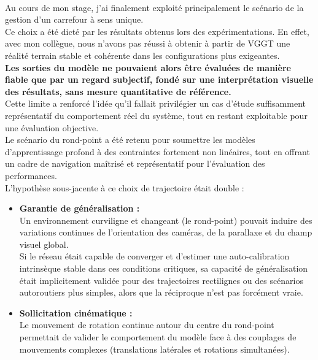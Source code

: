 \documentclass[12pt,a4paper,oneside]{report}
\begin{document}
\paragraph{}
Au cours de mon stage, j'ai finalement exploité principalement le scénario de la gestion d'un carrefour à sens unique.\\
\hspace*{.5cm}Ce choix a été dicté par les résultats obtenus lors des expérimentations. En effet, avec mon collègue, nous n'avons pas réussi à obtenir à partir de VGGT une réalité terrain stable et cohérente dans les configurations plus exigeantes.\\
\hspace*{.5cm}\textbf{Les sorties du modèle ne pouvaient alors être évaluées de manière fiable que par un regard subjectif, fondé sur une interprétation visuelle des résultats, sans mesure quantitative de référence.\\}
\hspace*{.5cm}Cette limite a renforcé l'idée qu'il fallait privilégier un cas d'étude suffisamment représentatif du comportement réel du système, tout en restant exploitable pour une évaluation objective. \\
\hspace*{.5cm}Le scénario du rond-point a été retenu pour soumettre les modèles d'apprentissage profond à des contraintes fortement non linéaires, tout en offrant un cadre de navigation maîtrisé et représentatif pour l'évaluation des performances.\\
L'hypothèse sous-jacente à ce choix de trajectoire était double :
\begin{itemize}[itemsep=1em]
    \item \textbf{Garantie de généralisation :}\\
    Un environnement curviligne et changeant (le rond-point) pouvait induire des variations continues de l'orientation des caméras, de la parallaxe et du champ visuel global.\\
    Si le réseau était capable de converger et d'estimer une auto-calibration intrinsèque stable dans ces conditions critiques, sa capacité de généralisation était implicitement validée pour des trajectoires rectilignes ou des scénarios autoroutiers plus simples, alors que la réciproque n'est pas forcément vraie.
    \item \textbf{Sollicitation cinématique :}\\
    Le mouvement de rotation continue autour du centre du rond-point permettait de valider le comportement du modèle face à des couplages de mouvements complexes (translations latérales et rotations simultanées).
\end{itemize}
\end{document}

